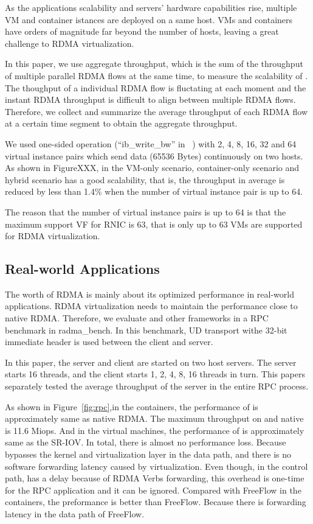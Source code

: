As the applications scalability and servers' hardware capabilities rise, multiple VM and container istances are deployed on a same host. VMs and containers have orders of magnitude far beyond the number of hosts, leaving a great challenge to RDMA virtualization. 

In this paper, we use aggregate throughput, which is the sum of the throughput of multiple parallel RDMA flows at the same time, to measure the scalability of \sys. The thoughput of a individual RDMA flow is fluctating at each moment and the instant RDMA throughput is difficult to align between multiple RDMA flows. Therefore, we collect and summarize the average throughput of each RDMA flow at a certain time segment to obtain the aggregate throughput.

We used one-sided operation (``ib\_write\_bw'' in ~\cite{perftest}) with 2, 4, 8, 16, 32 and 64 virtual instance pairs which send data (65536 Bytes) continuously on two hosts. As shown in FigureXXX, in the VM-only scenario, container-only scenario and hybrid scenario \sys has a good scalability, that is, the throughput in average is reduced by less than 1.4\% when the number of virtual instance pair is up to 64.

The reason that the number of virtual instance pairs is up to 64 is that the maximum support VF for RNIC is 63, that is only up to 63 VMs are supported for RDMA virtualization.

\subsection{Real-world Applications}

The worth of RDMA is mainly about its optimized performance in real-world applications. RDMA virtualization needs to maintain the performance close to native RDMA. Therefore, we evaluate \sys and other frameworks in a RPC benchmark in radma\_bench\cite{rbench}. In this benchmark, UD transport withe 32-bit immediate header is used between the client and server.

In this paper, the server and client are started on two host servers. The server starts 16 threads, and the client starts 1, 2, 4, 8, 16 threads in turn. This papers separately tested the average throughput of the server in the entire RPC process.

As shown in Figure~\ref{fig:rpc},in the containers, the performance of \sys is approximately same as native RDMA. The
maximum throughput on \sys and native is 11.6 Miops. And in the virtual machines, the performance of \sys is approximately same as the SR-IOV. In total, there is almost no performance loss. Because \sys bypasses the kernel and virtualization layer in the data path, and there is no software forwarding latency caused by virtualization. Even though, in the control path, \sys has a delay because of RDMA Verbs forwarding, this overhead is one-time for the RPC application and it can be ignored. Compared with FreeFlow in the containers, the preformance \sys is better than FreeFlow. Because there is forwarding latency in the data path of FreeFlow.

